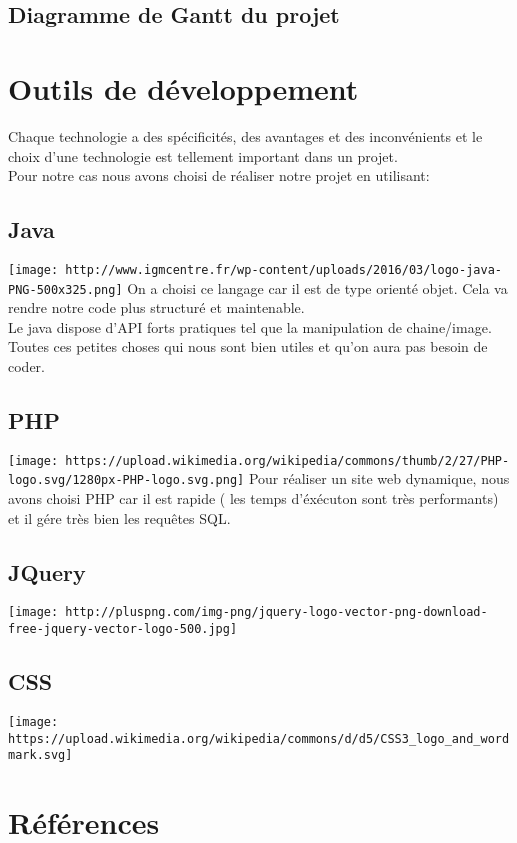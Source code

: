 \documentclass[12pt,a4paper]{article}
\begin{document}
\subsection{Diagramme de Gantt du projet}

\section{Outils de développement}
Chaque technologie a des spécificités, des avantages et des inconvénients et le choix d'une technologie est tellement important dans un projet.\\
Pour notre cas nous avons choisi de réaliser notre projet en utilisant:
\subsection{Java}
\texttt{[image: http://www.igmcentre.fr/wp-content/uploads/2016/03/logo-java-PNG-500x325.png]}
On a choisi ce langage car il est de type orienté objet. Cela va rendre notre code plus structuré et maintenable.\\
Le java dispose d'API forts pratiques tel que la manipulation de chaine/image. Toutes ces petites choses qui nous sont bien utiles et qu'on aura pas besoin de coder.
\subsection{PHP}
\texttt{[image: https://upload.wikimedia.org/wikipedia/commons/thumb/2/27/PHP-logo.svg/1280px-PHP-logo.svg.png]}
Pour réaliser un site web dynamique, nous avons choisi PHP car il est rapide ( les temps d'éxécuton sont très performants) et il gére très bien les requêtes SQL.
\subsection{JQuery}
\texttt{[image: http://pluspng.com/img-png/jquery-logo-vector-png-download-free-jquery-vector-logo-500.jpg]}
\subsection{CSS}
\texttt{[image: https://upload.wikimedia.org/wikipedia/commons/d/d5/CSS3\_logo\_and\_wordmark.svg]}
\section{Références}
\end{document}
